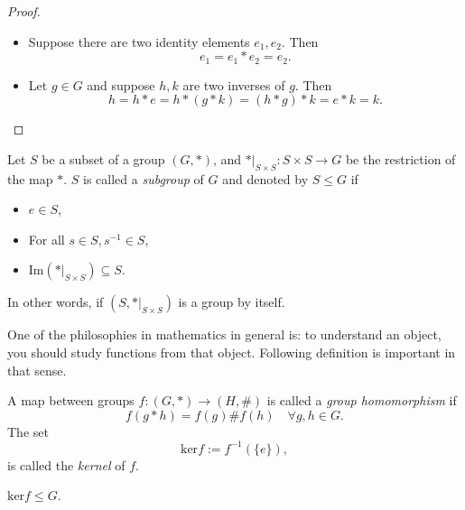 \begin{proof}
    \begin{itemize}
        \item Suppose there are two identity elements \(e_1, e_2\). Then \[e_1 = e_1 \ast e_2 = e_2.\]
        \item Let \(g \in G\) and suppose \(h, k\) are two inverses of \(g\). Then \[h = h \ast e = h \ast (g \ast k) = (h \ast g) \ast k = e \ast k = k.\]
    \end{itemize}
    \end{proof}
\begin{definition}[Subgroup]
    Let \(S\) be a subset of a group \((G, \ast)\), and \(\ast|_{S \times S}: S \times S \longrightarrow G\) be the restriction of the map \(\ast\). \(S\) is called a \emph{subgroup} of \(G\) and denoted by \(S \leq G\) if
    \begin{itemize}
        \item \(e \in S\), 
        \item For all \(s \in S, s^{-1} \in S\),
        \item \(\text{Im}(\ast|_{S \times S}) \subseteq S\).
    \end{itemize}
    In other words, if \((S, \ast|_{S \times S})\) is a group by itself.
\end{definition}
One of the philosophies in mathematics in general is: to understand an object, you should study functions from that object. Following definition is important in that sense.
\begin{definition}
    A map between groups \(f: (G, \ast) \longrightarrow (H, \#)\) is called a \emph{group homomorphism} if \[f(g \ast h) = f(g) \# f(h) \quad \forall g, h \in G.\]
    The set \[\text{ker} f := f^{-1}(\{e\}),\] is called the \emph{kernel} of \(f\).
\end{definition}
\begin{proposition}
    \(\text{ker} f \leq G\).
\end{proposition}
